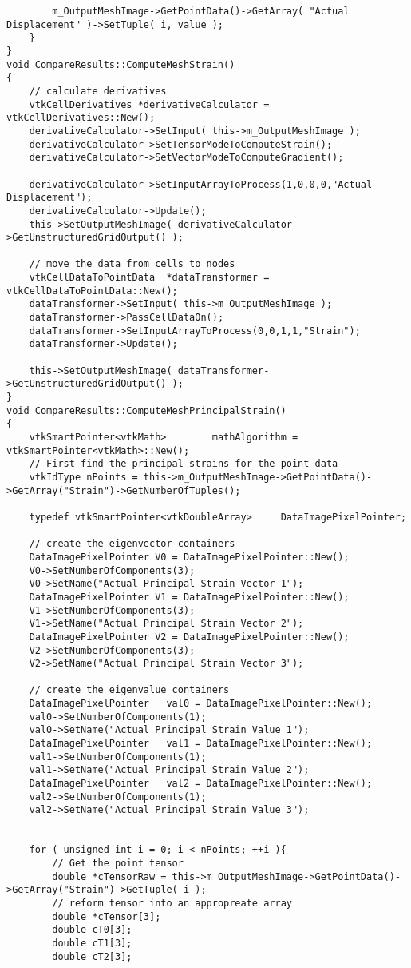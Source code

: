 \begin{lstlisting}
		m_OutputMeshImage->GetPointData()->GetArray( "Actual Displacement" )->SetTuple( i, value );
	}
}
void CompareResults::ComputeMeshStrain()
{
	// calculate derivatives
	vtkCellDerivatives *derivativeCalculator = vtkCellDerivatives::New();
	derivativeCalculator->SetInput( this->m_OutputMeshImage );
	derivativeCalculator->SetTensorModeToComputeStrain();
	derivativeCalculator->SetVectorModeToComputeGradient();
	
	derivativeCalculator->SetInputArrayToProcess(1,0,0,0,"Actual Displacement");
	derivativeCalculator->Update();
	this->SetOutputMeshImage( derivativeCalculator->GetUnstructuredGridOutput() );
		
	// move the data from cells to nodes
	vtkCellDataToPointData	*dataTransformer = vtkCellDataToPointData::New();
	dataTransformer->SetInput( this->m_OutputMeshImage );
	dataTransformer->PassCellDataOn();
	dataTransformer->SetInputArrayToProcess(0,0,1,1,"Strain");
	dataTransformer->Update();
	
	this->SetOutputMeshImage( dataTransformer->GetUnstructuredGridOutput() );
}
void CompareResults::ComputeMeshPrincipalStrain()
{
	vtkSmartPointer<vtkMath>		mathAlgorithm = vtkSmartPointer<vtkMath>::New();
	// First find the principal strains for the point data
	vtkIdType nPoints = this->m_OutputMeshImage->GetPointData()->GetArray("Strain")->GetNumberOfTuples();
	
	typedef	vtkSmartPointer<vtkDoubleArray>		DataImagePixelPointer;
	
	// create the eigenvector containers
	DataImagePixelPointer V0 = DataImagePixelPointer::New();
	V0->SetNumberOfComponents(3);
	V0->SetName("Actual Principal Strain Vector 1");
	DataImagePixelPointer V1 = DataImagePixelPointer::New();
	V1->SetNumberOfComponents(3);
	V1->SetName("Actual Principal Strain Vector 2");	
	DataImagePixelPointer V2 = DataImagePixelPointer::New();
	V2->SetNumberOfComponents(3);
	V2->SetName("Actual Principal Strain Vector 3");

	// create the eigenvalue containers
	DataImagePixelPointer	val0 = DataImagePixelPointer::New();
	val0->SetNumberOfComponents(1);
	val0->SetName("Actual Principal Strain Value 1");
	DataImagePixelPointer	val1 = DataImagePixelPointer::New();
	val1->SetNumberOfComponents(1);
	val1->SetName("Actual Principal Strain Value 2");
	DataImagePixelPointer	val2 = DataImagePixelPointer::New();
	val2->SetNumberOfComponents(1);
	val2->SetName("Actual Principal Strain Value 3");
	
	
	for ( unsigned int i = 0; i < nPoints; ++i ){
		// Get the point tensor
		double *cTensorRaw = this->m_OutputMeshImage->GetPointData()->GetArray("Strain")->GetTuple( i );
		// reform tensor into an appropreate array
		double *cTensor[3];
		double cT0[3];
		double cT1[3];
		double cT2[3];


\end{lstlisting}
